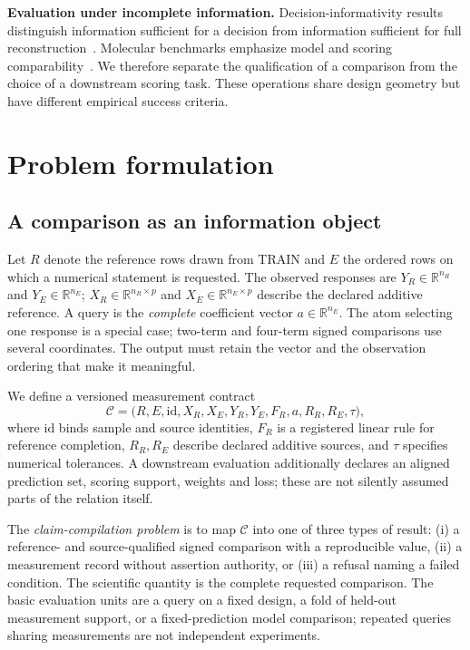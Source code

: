 \documentclass[preprint,11pt,times,number,sort&compress]{elsarticle}
\newcommand{\R}{\mathbb{R}}
\begin{document}
\textbf{Evaluation under incomplete information.} Decision-informativity results distinguish information sufficient for a decision from information sufficient for full reconstruction~\cite{vanwaarde2020informativity,bennouna2025decision,ye2026decisionsufficient}. Molecular benchmarks emphasize model and scoring comparability~\cite{vinas2026systema,wu2025perturbench,bernett2026dreval}. We therefore separate the qualification of a comparison from the choice of a downstream scoring task. These operations share design geometry but have different empirical success criteria.

\section{Problem formulation}\label{sec:problem}
\subsection{A comparison as an information object}
Let $R$ denote the reference rows drawn from TRAIN and $E$ the ordered rows on which a numerical statement is requested. The observed responses are $Y_R\in\R^{n_R}$ and $Y_E\in\R^{n_E}$; $X_R\in\R^{n_R\times p}$ and $X_E\in\R^{n_E\times p}$ describe the declared additive reference. A query is the \emph{complete} coefficient vector $a\in\R^{n_E}$. The atom selecting one response is a special case; two-term and four-term signed comparisons use several coordinates. The output must retain the vector and the observation ordering that make it meaningful.

We define a versioned measurement contract
\begin{equation}
\mathcal C=\big(R,E,\mathrm{id},X_R,X_E,Y_R,Y_E,F_R,a,R_R,R_E,\tau\big),
\label{eq:contract}
\end{equation}
where $\mathrm{id}$ binds sample and source identities, $F_R$ is a registered linear rule for reference completion, $R_R,R_E$ describe declared additive sources, and $\tau$ specifies numerical tolerances. A downstream evaluation additionally declares an aligned prediction set, scoring support, weights and loss; these are not silently assumed parts of the relation itself.

The \emph{claim-compilation problem} is to map $\mathcal C$ into one of three types of result: (i) a reference- and source-qualified signed comparison with a reproducible value, (ii) a measurement record without assertion authority, or (iii) a refusal naming a failed condition. The scientific quantity is the complete requested comparison. The basic evaluation units are a query on a fixed design, a fold of held-out measurement support, or a fixed-prediction model comparison; repeated queries sharing measurements are not independent experiments.
\end{document}
